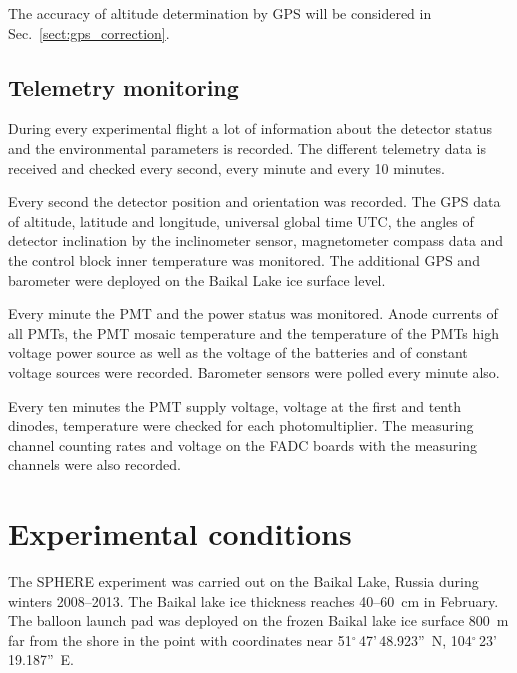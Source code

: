 \documentclass[final,5p,times,twocolumn]{elsarticle}
\begin{document}
The accuracy of altitude determination by GPS will be considered in Sec.~\ref{sect:gps_correction}.

\subsection{Telemetry monitoring\label{sect:telemetry}}

During every experimental flight a lot of information about the detector status and the environmental parameters is recorded. The different telemetry data is received and checked every second, every minute and every 10 minutes. 

Every second the detector position and orientation was recorded. The GPS data of altitude, latitude and longitude, universal global time UTC, the angles of detector inclination by the inclinometer sensor, magnetometer compass data and the control block inner temperature was monitored. The additional GPS and barometer were deployed on the Baikal Lake ice surface level.

Every minute the PMT and the power status was monitored. Anode currents of all PMTs, the PMT mosaic temperature and the temperature of the PMTs high voltage power source as well as the voltage of the batteries and of constant voltage sources were recorded. Barometer sensors were polled every minute also.

Every ten minutes the PMT supply voltage, voltage at the first and tenth dinodes, temperature were checked for each photomultiplier. The measuring channel counting rates and voltage on the FADC boards with the measuring channels were also recorded.


\section{Experimental conditions}
\label{sect:data}
 
The SPHERE experiment was carried out on the Baikal Lake, Russia during winters 2008--2013. The Baikal lake ice thickness reaches 40--60~cm in February. The balloon launch pad was deployed on the frozen Baikal lake ice surface 800~m far from the shore in the point with coordinates near 51$^\circ$\,47'\,48.923''~N, 104$^\circ$\,23'\,19.187''~E. 
\end{document}
